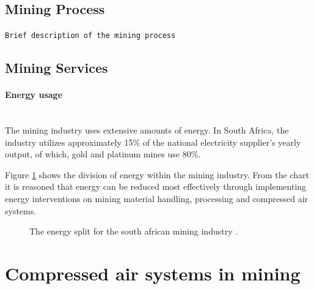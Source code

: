 \subsection{Mining Process}
\texttt{Brief description of the mining process}
\subsection{Mining Services}

\paragraph{Energy usage}\leavevmode\\
The mining industry uses extensive amounts of energy. In South Africa, the industry utilizes approximately 15\% of the national electricity supplier's yearly output, of which, gold and platinum mines use 80\%.\cite{Eskom2010Energy}
\par
Figure \ref{fig: Energy Split} shows the division of energy within the mining industry. From the chart it is reasoned that energy can be reduced most effectively through implementing energy interventions on mining material handling, processing and compressed air systems.
\begin{figure}[h]
	\centering
	\caption[The energy split for the south african mining industry.]{The energy split for the south african mining industry \cite{Eskom2010Energy}.}
	\label{fig: Energy Split}
\end{figure}

\section{Compressed air systems in mining}
